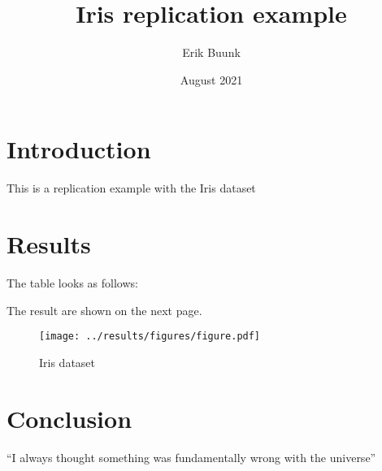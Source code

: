 \documentclass{article}
\title{Iris replication example}
\author{Erik Buunk}
\date{August 2021}
\begin{document}
\maketitle

\section{Introduction}
This is a replication example with the Iris dataset

\section{Results}
The table looks as follows:




The result are shown on the next page.

\begin{figure}
\centering
\texttt{[image: ../results/figures/figure.pdf]}
\caption{Iris dataset}
\label{fig:iris}
\end{figure}

\section{Conclusion}
``I always thought something was fundamentally wrong with the universe'' \citep{adams1995hitchhiker}



\end{document}
